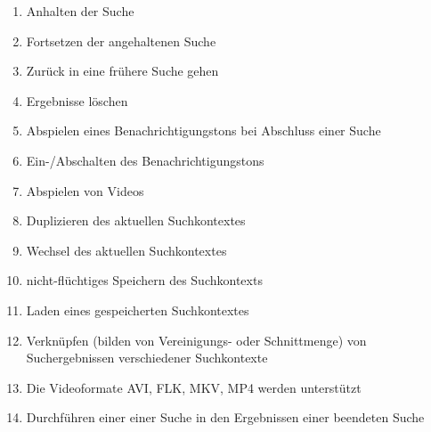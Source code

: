 \begin{enumerate} [label=\bfseries /F \arabic*0/]
	\subsection{Wunsch}
	\item Anhalten der Suche
	\item Fortsetzen der angehaltenen Suche
	\item Zurück in eine frühere Suche gehen %
	\item Ergebnisse löschen %
	\item Abspielen eines Benachrichtigungstons bei Abschluss einer Suche
	\item Ein-/Abschalten des Benachrichtigungstons
	\item Abspielen von Videos
	\item Duplizieren des aktuellen Suchkontextes
	\item Wechsel des aktuellen Suchkontextes
	\item nicht-fl\"uchtiges Speichern des Suchkontexts
	\item Laden eines gespeicherten Suchkontextes
	\item Verkn\"upfen (bilden von Vereinigungs- oder Schnittmenge) von Suchergebnissen verschiedener Suchkontexte
	\item Die Videoformate AVI, FLK, MKV, MP4 werden unterst\"utzt
	\item Durchführen einer einer Suche in den Ergebnissen einer beendeten Suche
\end{enumerate}
